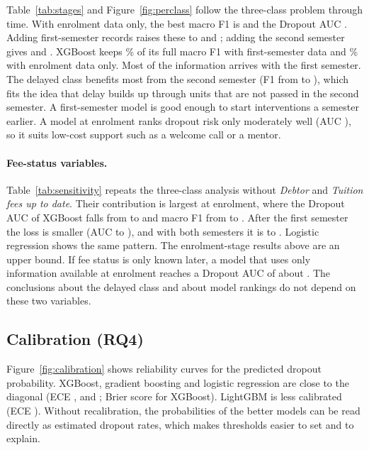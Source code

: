 \documentclass[11pt,a4paper]{article}
\begin{document}
Table~\ref{tab:stages} and Figure~\ref{fig:perclass} follow the three-class problem through time. With enrolment data only, the best macro F1 is \stageEnrolF{} and the Dropout AUC \stageEnrolAucDrop. Adding first-semester records raises these to \stageSemoneF{} and \stageSemoneAucDrop; adding the second semester gives \stageFullF{} and \stageFullAucDrop. XGBoost keeps \retainsem\% of its full macro F1 with first-semester data and \retainenrol\% with enrolment data only. Most of the information arrives with the first semester. The delayed class benefits most from the second semester (F1 from \stageSemoneFenrolled{} to \stageFullFenrolled), which fits the idea that delay builds up through units that are not passed in the second semester. A first-semester model is good enough to start interventions a semester earlier. A model at enrolment ranks dropout risk only moderately well (AUC \stageEnrolAucDrop), so it suits low-cost support such as a welcome call or a mentor.



\paragraph{Fee-status variables.} Table~\ref{tab:sensitivity} repeats the three-class analysis without \emph{Debtor} and \emph{Tuition fees up to date}. Their contribution is largest at enrolment, where the Dropout AUC of XGBoost falls from \sensEnrolXGBoostFeesAuc{} to \sensEnrolXGBoostNofeeAuc{} and macro F1 from \sensEnrolXGBoostFeesF{} to \sensEnrolXGBoostNofeeF. After the first semester the loss is smaller (AUC \sensSemoneXGBoostFeesAuc{} to \sensSemoneXGBoostNofeeAuc), and with both semesters it is \sensFullXGBoostFeesAuc{} to \sensFullXGBoostNofeeAuc. Logistic regression shows the same pattern. The enrolment-stage results above are an upper bound. If fee status is only known later, a model that uses only information available at enrolment reaches a Dropout AUC of about \sensEnrolXGBoostNofeeAuc. The conclusions about the delayed class and about model rankings do not depend on these two variables.



\subsection{Calibration (RQ4)}

Figure~\ref{fig:calibration} shows reliability curves for the predicted dropout probability. XGBoost, gradient boosting and logistic regression are close to the diagonal (ECE \eceXGBoost, \eceGradientBoosting{} and \eceLogisticRegression; Brier score \multiclassXGBoostbrierdropout{} for XGBoost). LightGBM is less calibrated (ECE \eceLightGBM). Without recalibration, the probabilities of the better models can be read directly as estimated dropout rates, which makes thresholds easier to set and to explain.
\end{document}

